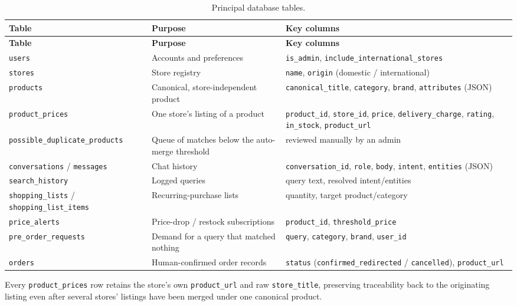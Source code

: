 \documentclass[12pt,a4paper]{report}
\begin{document}
\begin{longtable}{p{3.4cm}p{5.0cm}p{4.4cm}}
\caption{Principal database tables.}\label{tab:db} \\
\toprule
\textbf{Table} & \textbf{Purpose} & \textbf{Key columns} \\
\midrule
\endfirsthead
\toprule
\textbf{Table} & \textbf{Purpose} & \textbf{Key columns} \\
\midrule
\endhead
\texttt{users} & Accounts and preferences & \texttt{is\_admin}, \texttt{include\_international\_stores} \\
\texttt{stores} & Store registry & \texttt{name}, \texttt{origin} (domestic / international) \\
\texttt{products} & Canonical, store-independent product & \texttt{canonical\_title}, \texttt{category},
\texttt{brand}, \texttt{attributes} (JSON) \\
\texttt{product\_prices} & One store's listing of a product & \texttt{product\_id}, \texttt{store\_id},
\texttt{price}, \texttt{delivery\_charge}, \texttt{rating}, \texttt{in\_stock}, \texttt{product\_url} \\
\texttt{possible\_duplicate\_products} & Queue of matches below the auto-merge threshold & reviewed
manually by an admin \\
\texttt{conversations} / \texttt{messages} & Chat history & \texttt{conversation\_id}, \texttt{role},
\texttt{body}, \texttt{intent}, \texttt{entities} (JSON) \\
\texttt{search\_history} & Logged queries & query text, resolved intent/entities \\
\texttt{shopping\_lists} / \texttt{shopping\_list\_items} & Recurring-purchase lists & quantity, target
product/category \\
\texttt{price\_alerts} & Price-drop / restock subscriptions & \texttt{product\_id},
\texttt{threshold\_price} \\
\texttt{pre\_order\_requests} & Demand for a query that matched nothing & \texttt{query},
\texttt{category}, \texttt{brand}, \texttt{user\_id} \\
\texttt{orders} & Human-confirmed order records & \texttt{status} (\texttt{confirmed\_redirected} /
\texttt{cancelled}), \texttt{product\_url} \\
\bottomrule
\end{longtable}

\noindent Every \texttt{product\_prices} row retains the store's own \texttt{product\_url} and raw
\texttt{store\_title}, preserving traceability back to the originating listing even after several stores'
listings have been merged under one canonical product.
\end{document}
